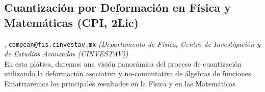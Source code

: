 \subsection{\sffamily Cuantizaci\'on por Deformaci\'on en F\'isica y Matem\'aticas {\footnotesize (CPI, 2Lic)}} \label{reg-1057} 
, {\tt compean@fis.cinvestav.mx}  {\slshape (Departamento de F\'isica, Centro de Investigaci\'on y de Estudios Avanzados (CINVESTAV))}\\
          \noindent En esta pl\'atica, daremos una visi\'on panor\'amica del proceso de cuantizaci\'on utilizando la deformaci\'on asociativa y no-conmutativa de \'algebras de funciones. Enfatizaremos los principales resultados en la F\'isica y en las Matem\'aticas.


